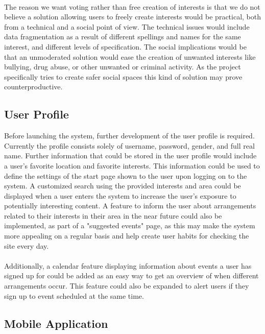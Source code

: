 \paragraph{} The reason we want voting rather than free creation of interests is that we do not believe a solution allowing users to freely create interests would be practical, both from a technical and a social point of view. The technical issues would include data fragmentation as a result of different spellings and names for the same interest, and different levels of specification. The social implications would be that an unmoderated solution  would ease the creation of unwanted interests like bullying, drug abuse, or other unwanted or criminal activity. As the project specifically tries to create safer social spaces this kind of solution may prove counterproductive.

\subsection{User Profile}
\label{subsec:FurtherRequiredUser}

Before launching the system, further development of the user profile is required. Currently the profile consists solely of username, password, gender, and full real name. Further information that could be stored in the user profile would include a user's favorite location and favorite interests. This information could be used to define the settings of the start page shown to the user upon logging on to the system. A customized search using the provided interests and area could be displayed when a user enters the system to increase the user’s exposure to potentially interesting content. A feature to inform the user about arrangements related to their interests in their area in the near future could also be implemented, as part of a "suggested events" page, as this may make the system more appealing on a regular basis and help create user habits for checking the site every day.
\paragraph{} Additionally, a calendar feature displaying information about events a user has signed up for could be added as an easy way to get an overview of when different arrangements occur. This feature could also be expanded to alert users if they sign up to event scheduled at the same time.

\subsection{Mobile Application}
\label{subsec:FurtherRequiredMobile}

